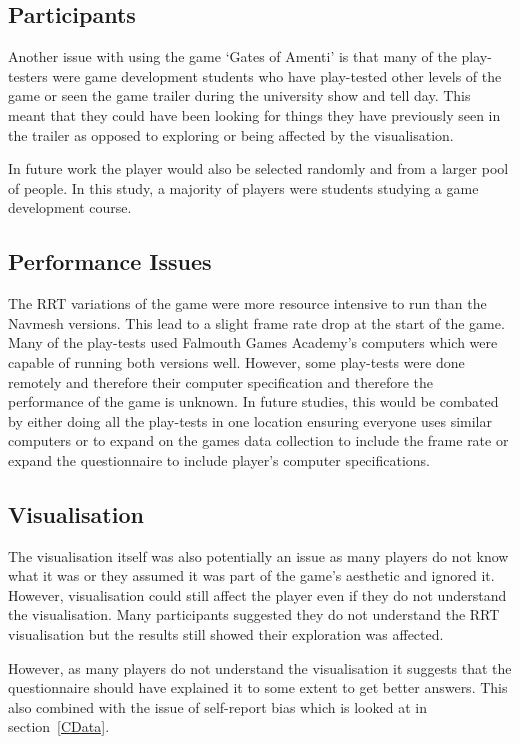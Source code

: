 \documentclass[journal]{IEEEtran}
\begin{document}
	\subsection{Participants}
	Another issue with using the game `Gates of Amenti' is that many of the play-testers were game development students who have play-tested other levels of the game or seen the game trailer during the university show and tell day. This meant that they could have been looking for things they have previously seen in the trailer as opposed to exploring or being affected by the visualisation.
	
	In future work the player would also be selected randomly and from a larger pool of people. In this study, a majority of players were students studying a game development course.
	
	\subsection{Performance Issues}
	The RRT variations of the game were more resource intensive to run than the Navmesh versions. This lead to a slight frame rate drop at the start of the game. 
	Many of the play-tests used Falmouth Games Academy's computers which were capable of running both versions well. However, some play-tests were done remotely and therefore their computer specification and therefore the performance of the game is unknown. In future studies, this would be combated by either doing all the play-tests in one location ensuring everyone uses similar computers or to expand on the games data collection to include the frame rate or expand the questionnaire to include player's computer specifications.     
	
	\subsection{Visualisation}    
	The visualisation itself was also potentially an issue as many players do not know what it was or they assumed it was part of the game's aesthetic and ignored it. However, visualisation could still affect the player even if they do not understand the visualisation.  Many participants suggested they do not understand the RRT visualisation but the results still showed their exploration was affected. 
	
	However, as many players do not understand the visualisation it suggests that the questionnaire should have explained it to some extent to get better answers. This also combined with the issue of self-report bias which is looked at in section~\ref{CData}. 
	
\end{document}
